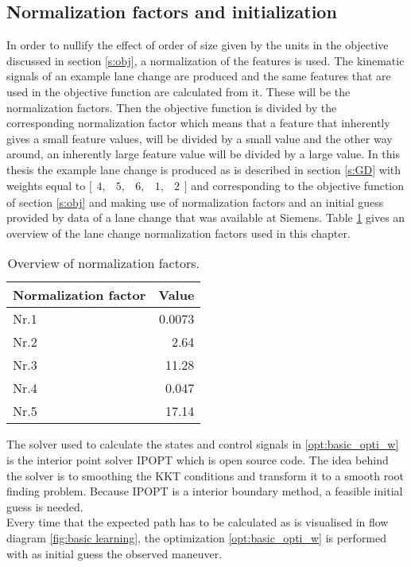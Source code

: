 \subsection{Normalization factors and initialization} \label{s:norm}
In order to nullify the effect of order of size given by the units in the objective discussed in section \ref{s:obj}, a normalization of the features is used. The kinematic signals of an example lane change are produced and the same features that are used in the objective function are calculated from it. These will be the normalization factors. Then the objective function is divided by the corresponding normalization factor which means that a feature that inherently gives a small feature values, will be divided by a small value and the other way around, an inherently large feature value will be divided by a large value. In this thesis the example lane change is produced as is described in section \ref{s:GD} with weights equal to $ \bigl[ \begin{smallmatrix} 4,&5,&6,&1,&2\end{smallmatrix}\bigr]$ and corresponding to the objective function of section \ref{s:obj} and making use of normalization factors and an initial guess provided by data of a lane change that was available at Siemens. Table \ref{table:norm} gives an overview of the lane change normalization factors used in this chapter. 

\begin{table}[h!]\label{table:norm}
  \centering
  \begin{tabular}{@{}lr@{}} 
    Normalization factor    & Value\\ \midrule
    Nr.1      & 0.0073\\
    Nr.2          & 2.64\\
    Nr.3       & 11.28\\
    Nr.4       & 0.047\\
    Nr.5  & 17.14\\ \bottomrule
  \end{tabular}
  \caption{Overview of  normalization factors.}
\end{table}

The solver used to calculate the states and control signals in \ref{opt:basic_opti_w} is the interior point solver IPOPT which is open source code. The idea behind the solver is to smoothing the KKT conditions and transform it to a smooth root finding problem. \cite{Panos_opti} Because IPOPT is a interior boundary method, a feasible initial guess is needed.\\
Every time that the expected path has to be calculated as is visualised in flow diagram \ref{fig:basic learning}, the optimization \ref{opt:basic_opti_w} is performed with as initial guess the observed maneuver.\\

